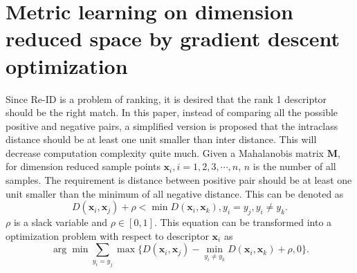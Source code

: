 \documentclass[conference,compsoc]{IEEEtran}
\begin{document}
 
\section{Metric learning on dimension reduced space by gradient descent optimization}
Since Re-ID is a problem of ranking, it is desired that the rank 1 descriptor should be the right match. In this paper, instead of comparing all the possible positive and negative pairs, a simplified version is proposed that the intraclass distance should be at least one unit smaller than inter distance. This will decrease computation complexity quite much. Given a Mahalanobis matrix $\bm{M}$, for dimension reduced sample points $\bm{x}_i, i = 1,2,3,\cdots,n$, $n$ is the number of all samples. The requirement is distance between positive pair should be at least one unit smaller than the minimum of all negative distance. This can be denoted as 
 \begin{equation}
 D(\bm{x}_i,\bm{x}_j) + \rho < \min D(\bm{x}_i,\bm{x}_k), y_i = y_j, y_i\ne y_k.
 \end{equation}
 $\rho$ is a slack variable and $\rho \in [0,1]$. This equation can be transformed into a optimization problem with respect to descriptor $\bm{x}_i$ as
 \begin{equation}\label{term2}
 \arg \min \sum_{y_i = y_j} \max \{D(\bm{x}_i,\bm{x}_j) -  \min_{ y_i\ne y_k} D(\bm{x}_i,\bm{x}_k)  + \rho, 0 \}.
 \end{equation}
 
\end{document}
